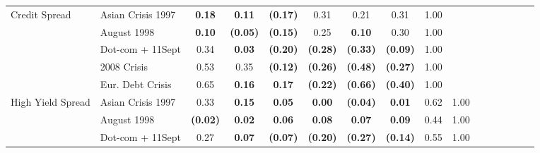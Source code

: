 \documentclass[12pt]{article}
\begin{document}
\begin{table}[H]
{\begin{tabular}{@{}llcccccccccccccc@{}}
Credit Spread     & Asian Crisis 1997 & \textbf{0.18}   & \textbf{0.11}   & \textbf{(0.17)} & 0.31            & 0.21            & 0.31            & 1.00            & \textbf{}       &                 &                 &                 &                 &                 &                 \\
                  & August 1998       & \textbf{0.10}   & \textbf{(0.05)} & \textbf{(0.15)} & 0.25            & \textbf{0.10}   & 0.30            & 1.00            &                 &                 &                 &                 &                 &                 &                 \\
                  & Dot-com + 11Sept  & 0.34            & \textbf{0.03}   & \textbf{(0.20)} & \textbf{(0.28)} & \textbf{(0.33)} & \textbf{(0.09)} & 1.00            &                 &                 &                 &                 &                 &                 &                 \\
                  & 2008 Crisis       & 0.53            & 0.35            & \textbf{(0.12)} & \textbf{(0.26)} & \textbf{(0.48)} & \textbf{(0.27)} & 1.00            &                 &                 &                 &                 &                 &                 &                 \\
                  & Eur. Debt Crisis  & 0.65            & \textbf{0.16}   & \textbf{0.17}   & \textbf{(0.22)} & \textbf{(0.66)} & \textbf{(0.40)} & 1.00            &                 &                 &                 &                 &                 &                 &                 \\
High Yield Spread & Asian Crisis 1997 & 0.33            & \textbf{0.15}   & \textbf{0.05}   & \textbf{0.00}   & \textbf{(0.04)} & \textbf{0.01}   & 0.62            & 1.00            &                 &                 &                 &                 &                 &                 \\
                  & August 1998       & \textbf{(0.02)} & \textbf{0.02}   & \textbf{0.06}   & \textbf{0.08}   & \textbf{0.07}   & \textbf{0.09}   & 0.44            & 1.00            &                 &                 &                 &                 &                 &                 \\
                  & Dot-com + 11Sept  & 0.27            & \textbf{0.07}   & \textbf{(0.07)} & \textbf{(0.20)} & \textbf{(0.27)} & \textbf{(0.14)} & 0.55            & 1.00            &                 &                 &                 &                 &                 &                 \\

\end{tabular}}
\end{table}
\end{document}

